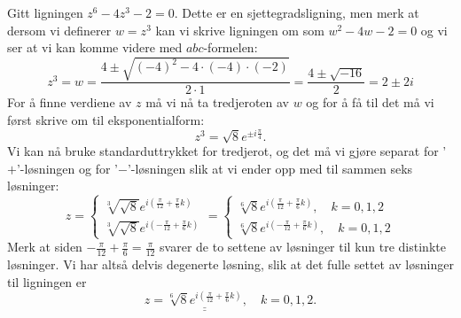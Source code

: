\documentclass[a4paper,norsk,12pt]{article}
\newcommand{\ans}[1]{\underline{\underline{#1}}}
\newcounter{exa}
\begin{document}
\begin{texample}
Gitt ligningen $z^6 - 4z^3 - 2=0$. Dette er en sjettegradsligning, men merk at dersom vi definerer $w=z^3$ kan vi skrive ligningen om som $w^2 - 4w - 2=0$ og vi ser at vi kan komme videre med $abc$-formelen:
\begin{displaymath}
	z^3 = w = \frac{4\pm\sqrt{(-4)^2-4\cdot(-4)\cdot(-2)}}{2\cdot1} = \frac{4\pm\sqrt{-16}}{2} = 2\pm2i
\end{displaymath}
For å finne verdiene av $z$ må vi nå ta tredjeroten av $w$ og for å få til det må vi først skrive om til eksponentialform:
\begin{displaymath}
	z^3 = \sqrt{8}e^{\pm i\frac{\pi}{4}}.
\end{displaymath}
Vi kan nå bruke standarduttrykket for tredjerot, og det må vi gjøre separat for '$+$'-løsningen og for '$-$'-løsningen slik at vi ender opp med til sammen seks løsninger:
\begin{displaymath}
	z = \begin{cases}
		\sqrt[3]{\sqrt{8}}e^{i\left(\frac{\pi}{12} + \frac{\pi}{6}k\right)} \\
		\sqrt[3]{\sqrt{8}}e^{i\left(-\frac{\pi}{12} + \frac{\pi}{6}k\right)}
	\end{cases}
	= \begin{cases}
		\sqrt[6]{8}e^{i\left(\frac{\pi}{12} + \frac{\pi}{6}k\right)}, \quad k=0, 1, 2 \\
		\sqrt[6]{8}e^{i\left(-\frac{\pi}{12} + \frac{\pi}{6}k\right)}, \quad k = 0, 1, 2
	\end{cases}
\end{displaymath}
Merk at siden $-\frac{\pi}{12} + \frac{\pi}{6} = \frac{\pi}{12}$ svarer de to settene av løsninger til kun tre distinkte løsninger. Vi har altså delvis degenerte løsning, slik at det fulle settet av løsninger til ligningen er
\begin{displaymath}
	z = \ans{\sqrt[6]{8}e^{i\left(\frac{\pi}{12} + \frac{\pi}{6}k\right)}}, \quad k=0, 1, 2.
\end{displaymath}
\end{texample}

\newpage
\end{document}
